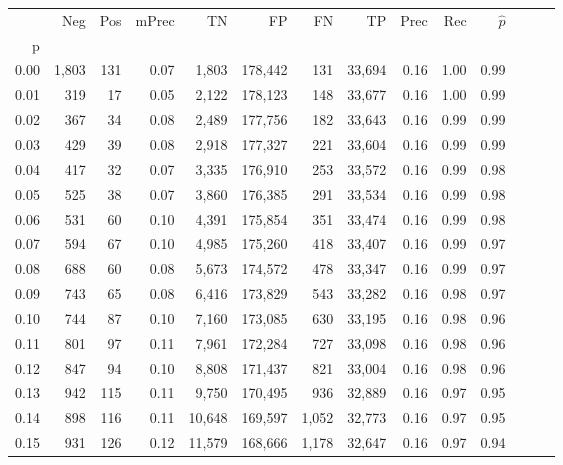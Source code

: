 \begin{tabular}{rrrrrrrrrrrrrr}
\toprule
{} &    Neg &  Pos & mPrec &       TN &       FP &      FN &      TP &  Prec &   Rec & $\hat{p}$ \\
p    &        &      &       &          &          &         &         &       &       &           \\
\midrule
0.00 &  1,803 &  131 &  0.07 &    1,803 &  178,442 &     131 &  33,694 &  0.16 &  1.00 &      0.99 \\
0.01 &    319 &   17 &  0.05 &    2,122 &  178,123 &     148 &  33,677 &  0.16 &  1.00 &      0.99 \\
0.02 &    367 &   34 &  0.08 &    2,489 &  177,756 &     182 &  33,643 &  0.16 &  0.99 &      0.99 \\
0.03 &    429 &   39 &  0.08 &    2,918 &  177,327 &     221 &  33,604 &  0.16 &  0.99 &      0.99 \\
0.04 &    417 &   32 &  0.07 &    3,335 &  176,910 &     253 &  33,572 &  0.16 &  0.99 &      0.98 \\
0.05 &    525 &   38 &  0.07 &    3,860 &  176,385 &     291 &  33,534 &  0.16 &  0.99 &      0.98 \\
0.06 &    531 &   60 &  0.10 &    4,391 &  175,854 &     351 &  33,474 &  0.16 &  0.99 &      0.98 \\
0.07 &    594 &   67 &  0.10 &    4,985 &  175,260 &     418 &  33,407 &  0.16 &  0.99 &      0.97 \\
0.08 &    688 &   60 &  0.08 &    5,673 &  174,572 &     478 &  33,347 &  0.16 &  0.99 &      0.97 \\
0.09 &    743 &   65 &  0.08 &    6,416 &  173,829 &     543 &  33,282 &  0.16 &  0.98 &      0.97 \\
0.10 &    744 &   87 &  0.10 &    7,160 &  173,085 &     630 &  33,195 &  0.16 &  0.98 &      0.96 \\
0.11 &    801 &   97 &  0.11 &    7,961 &  172,284 &     727 &  33,098 &  0.16 &  0.98 &      0.96 \\
0.12 &    847 &   94 &  0.10 &    8,808 &  171,437 &     821 &  33,004 &  0.16 &  0.98 &      0.96 \\
0.13 &    942 &  115 &  0.11 &    9,750 &  170,495 &     936 &  32,889 &  0.16 &  0.97 &      0.95 \\
0.14 &    898 &  116 &  0.11 &   10,648 &  169,597 &   1,052 &  32,773 &  0.16 &  0.97 &      0.95 \\
0.15 &    931 &  126 &  0.12 &   11,579 &  168,666 &   1,178 &  32,647 &  0.16 &  0.97 &      0.94 \\

\end{tabular}
